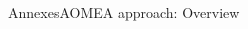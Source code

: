 \begin{frame}{Annexes}{AOMEA approach: Overview}
\begin{columns}
        \begin{column}{0.4\textwidth}
            \centering
        \end{column}

    \end{columns}

\end{frame}



